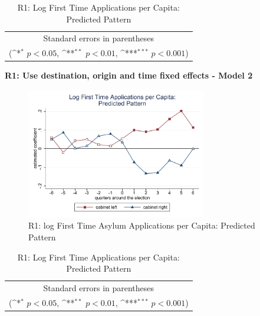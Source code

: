 \documentclass[10pt,a4paper]{scrartcl}
\begin{document}
\begin{table}[!ht]\centering
	\renewcommand{\arraystretch}{1.25}
	\def\sym#1{\ifmmode^{#1}\else\(^{#1}\)\fi}
	\caption{R1: Log First Time Applications per Capita: Predicted Pattern}
	\begin{tabular}{l*{2}{c}}
		\hline\hline
		
		\hline\hline
		\multicolumn{3}{c}{\footnotesize Standard errors in parentheses} \\
		\multicolumn{3}{c}{\footnotesize (\sym{*} \(p<0.05\), \sym{**} \(p<0.01\), \sym{***} \(p<0.001\))}\\
	\end{tabular}
\end{table}

\clearpage
\textbf{ R1: Use destination, origin and time fixed effects - Model 2}
\begin{figure}[!ht]
	\centering
	\includegraphics[width=0.7\textwidth]{figures_edited/app_graph2_R1.pdf}
	\caption{R1: log First Time Asylum Applications per Capita: Predicted Pattern}
\end{figure}

\begin{table}[!ht]\centering
	\footnotesize
	\renewcommand{\arraystretch}{1.2}
	\def\sym#1{\ifmmode^{#1}\else\(^{#1}\)\fi}
	\caption{R1: Log First Time Applications per Capita: Predicted Pattern}
	\begin{tabular}{l*{2}{c}}
		\hline\hline
		
		\hline\hline
		\multicolumn{3}{c}{\footnotesize Standard errors in parentheses} \\
		\multicolumn{3}{c}{\footnotesize (\sym{*} \(p<0.05\), \sym{**} \(p<0.01\), \sym{***} \(p<0.001\))}\\
	\end{tabular}
\end{table}
\end{document}
